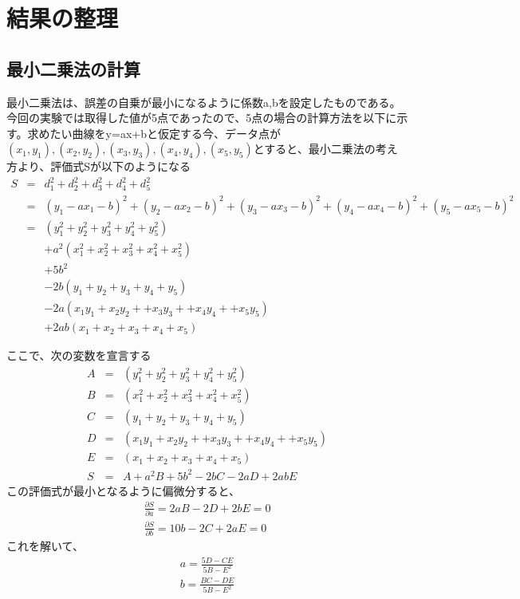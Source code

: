 \documentclass[a4j,twoside,openright,11pt]{jarticle}
\begin{document}
\section{結果の整理}
\subsection{最小二乗法の計算}
最小二乗法は、誤差の自乗が最小になるように係数a,bを設定したものである。今回の実験では取得した値が5点であったので、5点の場合の計算方法を以下に示す。求めたい曲線をy=ax+bと仮定する今、データ点が$(x_1,y_1),(x_2,y_2),(x_3,y_3),(x_4,y_4),(x_5,y_5)$とすると、最小二乗法の考え方より、評価式Sが以下のようになる
\begin{eqnarray}
S &=& d_1^2 + d_2^2 + d_3^2 + d_4^2 + d_5^2 \nonumber\\
&=& (y_1-ax_1-b)^2 + (y_2-ax_2-b)^2 + (y_3-ax_3-b)^2 + (y_4-ax_4-b)^2 + (y_5-ax_5-b)^2\nonumber \\
&=&(y_1^2 + y_2^2 + y_3^2 + y_4^2 + y_5^2)\nonumber\\
&& +a^2(x_1^2 + x_2^2 + x_3^2 + x_4^2 + x_5^2)\nonumber\\
&& +5b^2\nonumber\\ 
&&- 2b(y_1 + y_2 + y_3 + y_4 + y_5)\nonumber\\
&& -2a(x_1y_1 + x_2y_2 + + x_3y_3 + + x_4y_4 + + x_5y_5) \nonumber\\
&&+ 2ab(x_1 + x_2 + x_3 + x_4 + x_5)
\end{eqnarray}

ここで、次の変数を宣言する
\begin{eqnarray}
A&=&(y_1^2 + y_2^2 + y_3^2 + y_4^2 + y_5^2)\nonumber\\
B&=&(x_1^2 + x_2^2 + x_3^2 + x_4^2 + x_5^2)\nonumber\\ 
C&=&(y_1 + y_2 + y_3 + y_4 + y_5)\nonumber\\
D&=&(x_1y_1 + x_2y_2 + + x_3y_3 + + x_4y_4 + + x_5y_5) \nonumber\\
E&=&(x_1 + x_2 + x_3 + x_4 + x_5)\nonumber\\
S&=&A+a^2B+5b^2-2bC-2aD+2abE
\end{eqnarray}
この評価式が最小となるように偏微分すると、
\begin{eqnarray}
\frac{\partial S}{\partial a} = 2aB-2D+2bE = 0\nonumber\\
\frac{\partial S}{\partial b} = 10b-2C+2aE  = 0\nonumber
\end{eqnarray}
これを解いて、
\begin{eqnarray}
a=\frac{5D-CE}{5B-E^2}\nonumber\\
b=\frac{BC-DE}{5B-E^2}
\end{eqnarray}
\end{document}
